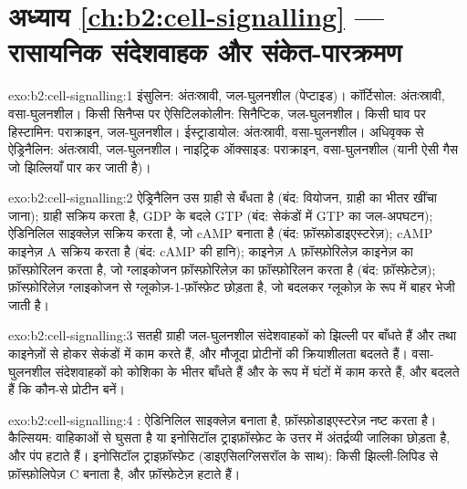 \section*{अध्याय \ref{ch:b2:cell-signalling} --- रासायनिक संदेशवाहक और संकेत-पारक्रमण}

\begin{solution}{exo:b2:cell-signalling:1}
इंसुलिन: अंतःस्रावी, जल-घुलनशील (पेप्टाइड)। कॉर्टिसोल: अंतःस्रावी,
वसा-घुलनशील। किसी सिनैप्स पर ऐसिटिलकोलीन: सिनैप्टिक, जल-घुलनशील।
किसी घाव पर हिस्टामिन: पराक्राइन, जल-घुलनशील। ईस्ट्राडायोल:
अंतःस्रावी, वसा-घुलनशील। अधिवृक्क से ऐड्रिनैलिन: अंतःस्रावी,
जल-घुलनशील। नाइट्रिक ऑक्साइड: पराक्राइन, वसा-घुलनशील (यानी ऐसी गैस जो
झिल्लियाँ पार कर जाती है)।
\end{solution}

\begin{solution}{exo:b2:cell-signalling:2}
ऐड्रिनैलिन उस ग्राही से बँधता है (बंद: वियोजन, ग्राही का
भीतर खींचा जाना); ग्राही  सक्रिय करता है, GDP के बदले GTP (बंद:
सेकंडों में GTP का जल-अपघटन);  ऐडिनिलिल साइक्लेज़ सक्रिय करता है,
जो cAMP बनाता है (बंद: फ़ॉस्फ़ोडाइएस्टरेज़); cAMP काइनेज़ A सक्रिय करता है
(बंद: cAMP की हानि); काइनेज़ A फ़ॉस्फ़ोरिलेज़ काइनेज़ का फ़ॉस्फ़ोरिलन करता है,
जो ग्लाइकोजन फ़ॉस्फ़ोरिलेज़ का फ़ॉस्फ़ोरिलन करता है (बंद: फ़ॉस्फ़ेटेज़);
फ़ॉस्फ़ोरिलेज़ ग्लाइकोजन से ग्लूकोज़-1-फ़ॉस्फ़ेट छोड़ता है, जो बदलकर
ग्लूकोज़ के रूप में बाहर भेजी जाती है।
\end{solution}

\begin{solution}{exo:b2:cell-signalling:3}
सतही ग्राही जल-घुलनशील संदेशवाहकों को झिल्ली पर बाँधते हैं और
 तथा काइनेज़ों से होकर सेकंडों में काम करते हैं, और
मौजूदा प्रोटीनों की क्रियाशीलता बदलते हैं।  वसा-घुलनशील
संदेशवाहकों को कोशिका के भीतर बाँधते हैं और  के रूप में घंटों में
काम करते हैं, और बदलते हैं कि कौन-से प्रोटीन बनें।
\end{solution}

\begin{solution}{exo:b2:cell-signalling:4}
: ऐडिनिलिल साइक्लेज़ बनाता है,
फ़ॉस्फ़ोडाइएस्टरेज़ नष्ट करता है। कैल्सियम: वाहिकाओं से घुसता है या
इनोसिटॉल ट्राइफ़ॉस्फ़ेट के उत्तर में अंतर्द्रव्यी जालिका छोड़ता है, और
पंप हटाते हैं। इनोसिटॉल ट्राइफ़ॉस्फ़ेट (डाइएसिलग्लिसरॉल के साथ): किसी
झिल्ली-लिपिड से फ़ॉस्फ़ोलिपेज़ C बनाता है, और फ़ॉस्फ़ेटेज़ हटाते हैं।
\end{solution}

